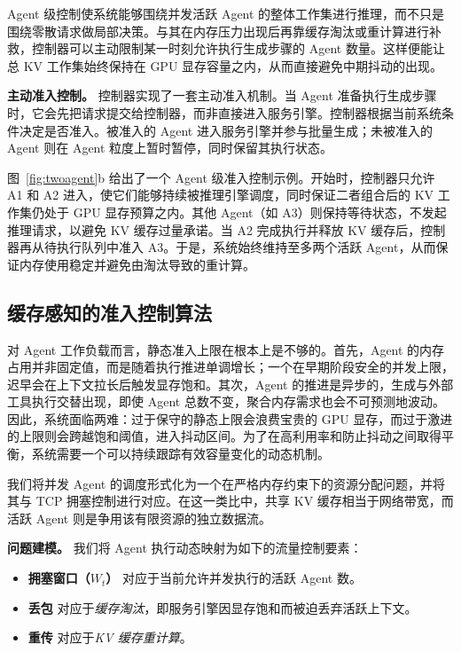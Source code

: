 Agent 级控制使系统能够围绕并发活跃 Agent 的整体工作集进行推理，而不只是围绕零散请求做局部决策。与其在内存压力出现后再靠缓存淘汰或重计算进行补救，控制器可以主动限制某一时刻允许执行生成步骤的 Agent 数量。这样便能让总 KV 工作集始终保持在 GPU 显存容量之内，从而直接避免中期抖动的出现。

\noindent\textbf{主动准入控制。}
控制器实现了一套主动准入机制。当 Agent 准备执行生成步骤时，它会先把请求提交给控制器，而非直接进入服务引擎。控制器根据当前系统条件决定是否准入。被准入的 Agent 进入服务引擎并参与批量生成；未被准入的 Agent 则在 Agent 粒度上暂时暂停，同时保留其执行状态。

图~\ref{fig:twoagent}b 给出了一个 Agent 级准入控制示例。开始时，控制器只允许 A1 和 A2 进入，使它们能够持续被推理引擎调度，同时保证二者组合后的 KV 工作集仍处于 GPU 显存预算之内。其他 Agent（如 A3）则保持等待状态，不发起推理请求，以避免 KV 缓存过量承诺。当 A2 完成执行并释放 KV 缓存后，控制器再从待执行队列中准入 A3。于是，系统始终维持至多两个活跃 Agent，从而保证内存使用稳定并避免由淘汰导致的重计算。

\subsection{缓存感知的准入控制算法}
\label{subsec:AIMD}

对 Agent 工作负载而言，静态准入上限在根本上是不够的。首先，Agent 的内存占用并非固定值，而是随着执行推进单调增长；一个在早期阶段安全的并发上限，迟早会在上下文拉长后触发显存饱和。其次，Agent 的推进是异步的，生成与外部工具执行交替出现，即使 Agent 总数不变，聚合内存需求也会不可预测地波动。因此，系统面临两难：过于保守的静态上限会浪费宝贵的 GPU 显存，而过于激进的上限则会跨越饱和阈值，进入抖动区间。为了在高利用率和防止抖动之间取得平衡，系统需要一个可以持续跟踪有效容量变化的动态机制。

我们将并发 Agent 的调度形式化为一个在严格内存约束下的资源分配问题，并将其与 TCP 拥塞控制进行对应。在这一类比中，共享 KV 缓存相当于网络带宽，而活跃 Agent 则是争用该有限资源的独立数据流。

\noindent\textbf{问题建模。}
我们将 Agent 执行动态映射为如下的流量控制要素：
\begin{itemize}[nosep]
    \item[(1)] \textbf{拥塞窗口（$W_t$）} 对应于当前允许并发执行的活跃 Agent 数。
    \item[(2)] \textbf{丢包} 对应于\emph{缓存淘汰}，即服务引擎因显存饱和而被迫丢弃活跃上下文。
    \item[(3)] \textbf{重传} 对应于\emph{KV 缓存重计算}。
\end{itemize}

